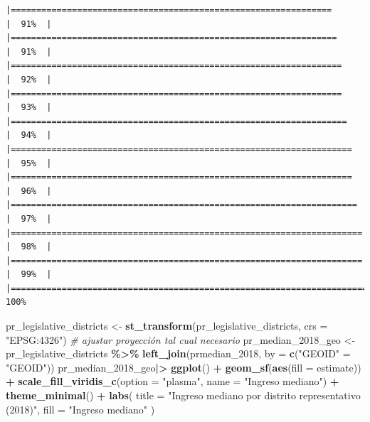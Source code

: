 \documentclass[
]{article}
\newenvironment{Shaded}{\begin{snugshade}}{\end{snugshade}}
\newcommand{\AttributeTok}[1]{\textcolor[rgb]{0.13,0.29,0.53}{#1}}
\newcommand{\CommentTok}[1]{\textcolor[rgb]{0.56,0.35,0.01}{\textit{#1}}}
\newcommand{\FunctionTok}[1]{\textcolor[rgb]{0.13,0.29,0.53}{\textbf{#1}}}
\newcommand{\NormalTok}[1]{#1}
\newcommand{\OtherTok}[1]{\textcolor[rgb]{0.56,0.35,0.01}{#1}}
\newcommand{\SpecialCharTok}[1]{\textcolor[rgb]{0.81,0.36,0.00}{\textbf{#1}}}
\newcommand{\StringTok}[1]{\textcolor[rgb]{0.31,0.60,0.02}{#1}}
\begin{document}
\begin{verbatim}
|===============================================================       |  91%  |                                                                              |================================================================      |  91%  |                                                                              |=================================================================     |  92%  |                                                                              |=================================================================     |  93%  |                                                                              |==================================================================    |  94%  |                                                                              |===================================================================   |  95%  |                                                                              |===================================================================   |  96%  |                                                                              |====================================================================  |  97%  |                                                                              |===================================================================== |  98%  |                                                                              |===================================================================== |  99%  |                                                                              |======================================================================| 100%
\end{verbatim}

\begin{Shaded}
\begin{Highlighting}[]
\NormalTok{pr\_legislative\_districts }\OtherTok{\textless{}{-}} \FunctionTok{st\_transform}\NormalTok{(pr\_legislative\_districts, }\AttributeTok{crs =} \StringTok{"EPSG:4326"}\NormalTok{)  }\CommentTok{\# ajustar proyección tal cual necesario}
\NormalTok{pr\_median\_2018\_geo }\OtherTok{\textless{}{-}}\NormalTok{ pr\_legislative\_districts }\SpecialCharTok{\%\textgreater{}\%}
  \FunctionTok{left\_join}\NormalTok{(prmedian\_2018, }\AttributeTok{by =} \FunctionTok{c}\NormalTok{(}\StringTok{"GEOID"} \OtherTok{=} \StringTok{"GEOID"}\NormalTok{))  }
\NormalTok{pr\_median\_2018\_geo}\SpecialCharTok{|\textgreater{}}
  \FunctionTok{ggplot}\NormalTok{() }\SpecialCharTok{+}
  \FunctionTok{geom\_sf}\NormalTok{(}\FunctionTok{aes}\NormalTok{(}\AttributeTok{fill =}\NormalTok{ estimate)) }\SpecialCharTok{+}
  \FunctionTok{scale\_fill\_viridis\_c}\NormalTok{(}\AttributeTok{option =} \StringTok{"plasma"}\NormalTok{, }\AttributeTok{name =} \StringTok{"Ingreso mediano"}\NormalTok{) }\SpecialCharTok{+}
  \FunctionTok{theme\_minimal}\NormalTok{() }\SpecialCharTok{+}
  \FunctionTok{labs}\NormalTok{(}
    \AttributeTok{title =} \StringTok{"Ingreso mediano por distrito representativo (2018)"}\NormalTok{,}
    \AttributeTok{fill =} \StringTok{"Ingreso mediano"}
\NormalTok{  )}
\end{Highlighting}
\end{Shaded}
\end{document}
